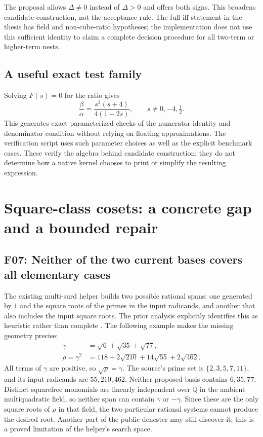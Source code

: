 \documentclass[11pt,letterpaper]{article}
\numberwithin{equation}{section}
\theoremstyle{definition}\newtheorem{definition}[theorem]{Definition}
\theoremstyle{remark}\newtheorem{remark}[theorem]{Remark}
\newcommand{\Q}{\mathbb Q}\newcommand{\C}{\mathbb C}\newcommand{\R}{\mathbb R}\newcommand{\Z}{\mathbb Z}
\newcommand{\finding}[2]{\subsection{#1: #2}}
\begin{document}
The proposal allows $\Delta\ne0$ instead of $\Delta>0$ and offers both signs. This broadens candidate construction, not the acceptance rule. The full iff statement in the thesis has field and non-cube-ratio hypotheses; the implementation does not use this sufficient identity to claim a complete decision procedure for all two-term or higher-term nests.

\subsection{A useful exact test family}
Solving $F(s)=0$ for the ratio gives
\begin{equation}
\frac\beta\alpha=\frac{s^3(s+4)}{4(1-2s)},
\qquad s\ne0,-4,\tfrac12.
\end{equation}
This generates exact parameterized checks of the numerator identity and denominator condition without relying on floating approximations. The verification script uses such parameter choices as well as the explicit benchmark cases. These verify the algebra behind candidate construction; they do not determine how a native kernel chooses to print or simplify the resulting expression.

\section{Square-class cosets: a concrete gap and a bounded repair}
\label{sec:cosets}
\finding{F07}{Neither of the two current bases covers all elementary cases}
The existing multi-surd helper builds two possible rational spans: one generated by $1$ and the square roots of the primes in the input radicands, and another that also includes the input square roots. The prior analysis explicitly identifies this as heuristic rather than complete \cite{source,prior}. The following example makes the missing geometry precise:
\begin{align}
\gamma&=\sqrt6+\sqrt{35}+\sqrt{77},\\
\rho=\gamma^2&=118+2\sqrt{210}+14\sqrt{55}+2\sqrt{462}.
\label{eq:cosetexample}
\end{align}
All terms of $\gamma$ are positive, so $\sqrt\rho=\gamma$. The source's prime set is $\{2,3,5,7,11\}$, and its input radicands are $55,210,462$. Neither proposed basis contains $6,35,77$. Distinct squarefree monomials are linearly independent over $\Q$ in the ambient multiquadratic field, so neither span can contain $\gamma$ or $-\gamma$. Since these are the only square roots of $\rho$ in that field, the two particular rational systems cannot produce the desired root. Another part of the public denester may still discover it; this is a proved limitation of the helper's search space.
\end{document}
